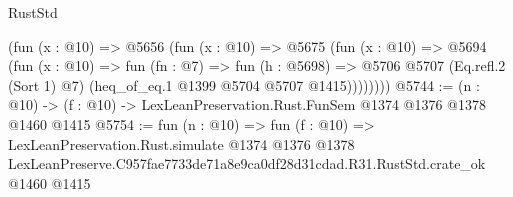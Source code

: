 \begin{lexlean}{RustStd}
\begin{coremodule}
          (fun (x : @10) =>
          @5656
            (fun (x : @10) =>
            @5675
              (fun (x : @10) =>
              @5694
                (fun (x : @10) =>
                fun (fn : @7) =>
                fun (h : @5698) =>
                @5706 @5707 (Eq.refl.{2} (Sort 1) @7) (heq_of_eq.{1} @1399 @5704 @5707 @1415))))))))
@5744 := (n : @10) -> (f : @10) -> LexLeanPreservation.Rust.FunSem @1374 @1376 @1378 @1460 @1415
@5754 := fun (n : @10) =>
  fun (f : @10) =>
  LexLeanPreservation.Rust.simulate
    @1374
    @1376
    @1378
    LexLeanPreserve.C957fae7733de71a8e9ca0df28d31cdad.R31.RustStd.crate_ok
    @1460
    @1415
\end{coremodule}
\end{lexlean}
